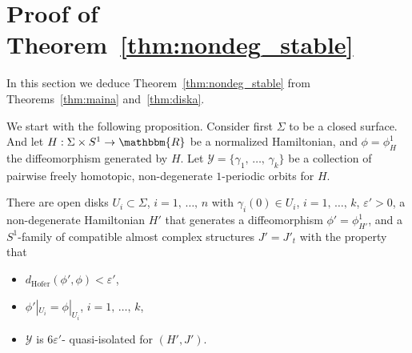 \documentclass[AHL,Unicode,longabstracts,published]{cedram}
\newcommand{\R}{\mathbbm{R}}
\newcommand{\hofer}{\mathrm{Hofer}}
\newcommand{\clY}{\mathcal{Y}}
\newcommand{\hofer}{\mathrm{Hofer}}
\begin{document}
\section{Proof of Theorem~\ref{thm:nondeg_stable}}\label{sec:nondeg_stable}

In this section we deduce Theorem~\ref{thm:nondeg_stable} from Theorems~\ref{thm:maina} and~\ref{thm:diska}.

We start with the following proposition. Consider first $\Sigma$ to be a closed surface. And let $H:\Sigma \times S^1 \to \R$ be a normalized Hamiltonian, and $\phi = \phi^1_H$ the diffeomorphism generated by $H$. Let $\clY= \{\gamma_1,\, \ldots,\, \gamma_k\}$ be a collection of pairwise freely homotopic, non-degenerate $1$-periodic orbits for $H$.

\begin{prop}\label{prop:first_perturb}
There are open disks $U_i\subset \Sigma$, $i=1, \,\ldots,\,n$ with $\gamma_i(0)\in U_i$, $i=1,\,\ldots,\,k$, $\varepsilon'>0$, a non-degenerate Hamiltonian $H'$ that generates a diffeomorphism $\phi'= \phi^1_{H'}$, and a $S^1$-family of compatible almost complex structures $J'=J'_t$ with the property that
\begin{itemize}
\item $d_{\hofer}(\phi', \phi) < {\varepsilon'}$,
\item $\phi'|_{U_i} = \phi|_{U_i}$, $i=1,\,\ldots,\,k$,
\item $\clY$ is $6\varepsilon'$- quasi-isolated for $(H', J')$.
\end{itemize}
\end{prop}
\end{document}
